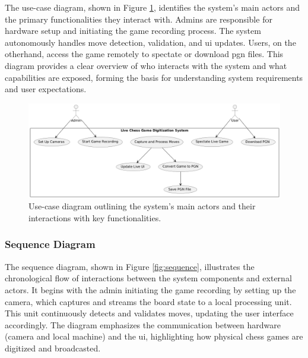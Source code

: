 The use-case diagram, shown in Figure \ref{fig:use-case}, identifies the system’s main actors and the primary functionalities they interact with. Admins are responsible for hardware setup and initiating the game recording process. The system autonomously handles move detection, validation, and \gls{ui} updates. Users, on the otherhand, access the game remotely to spectate or download \gls{pgn} files. This diagram provides a clear overview of who interacts with the system and what capabilities are exposed, forming the basis for understanding system requirements and user expectations.

\begin{figure}[h!]
    \centering
    \includegraphics[width=0.75\linewidth]{figures/results/uml/use-case.png}
    \caption[Use-case diagram]{Use-case diagram outlining the system’s main actors and their interactions with key functionalities.}
    \label{fig:use-case}
\end{figure}  

\newpage

\subsubsection*{Sequence Diagram}
\label{subsubsec:sequence-diagram}

The sequence diagram, shown in Figure \ref{fig:sequence}, illustrates the chronological flow of interactions between the system components and external actors. It begins with the admin initiating the game recording by setting up the camera, which captures and streams the board state to a local processing unit. This unit continuously detects and validates moves, updating the user interface accordingly. The diagram emphasizes the communication between hardware (camera and local machine) and the \gls{ui}, highlighting how physical chess games are digitized and broadcasted.


